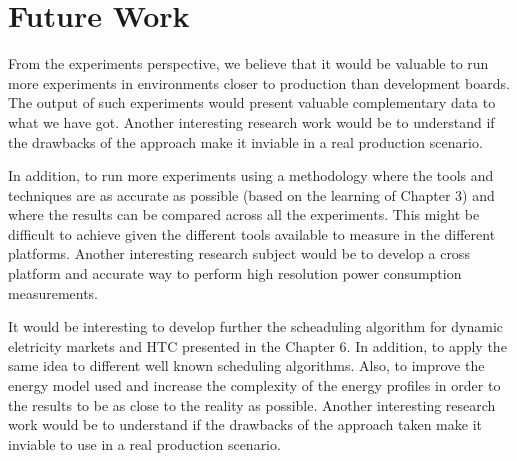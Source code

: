 \chapter{Future Work}

From the experiments perspective, we believe that it would be valuable to run more experiments in environments closer to production than development boards. The output of such experiments would present valuable complementary data to what we have got. Another interesting research work would be to understand if the drawbacks of the approach make it inviable in a real production scenario.


In addition, to run more experiments using a methodology where the tools and techniques are as accurate as possible (based on the learning of Chapter 3) and where the results can be compared across all the experiments. This might be difficult to achieve given the different tools available to measure in the different platforms. Another interesting research subject would be to develop a cross platform and accurate way to perform high resolution power consumption measurements.


It would be interesting to develop further the scheaduling algorithm for dynamic eletricity markets and HTC presented in the Chapter 6. In addition, to apply the same idea to different well known scheduling algorithms. Also, to improve the energy model used and increase the complexity of the energy profiles in order to the results to be as close to the reality as possible. Another interesting research work would be to understand if the drawbacks of the approach taken make it inviable to use in a real production scenario.

